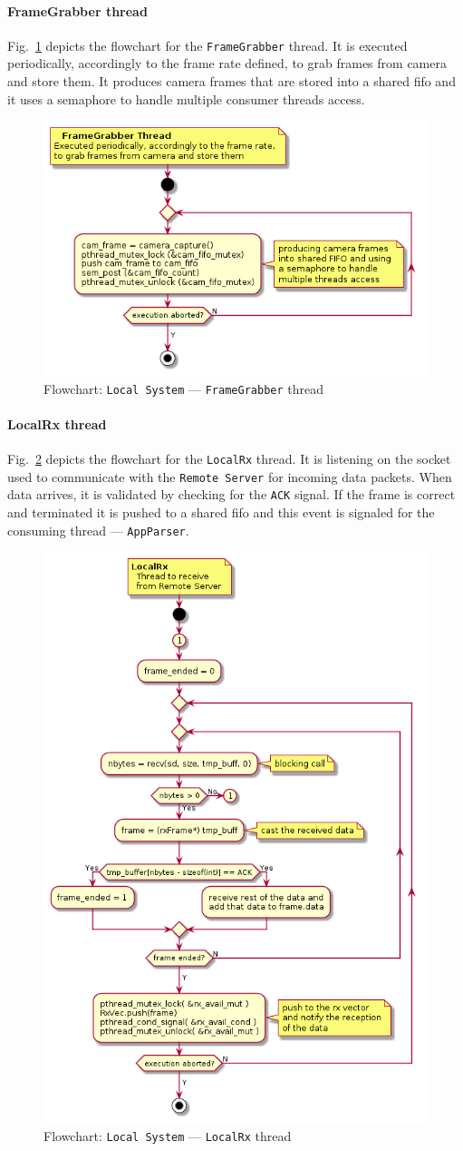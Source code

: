 \paragraph{FrameGrabber thread}
Fig.~\ref{fig:flow-local-frame-grabber} depicts the flowchart for the
\texttt{FrameGrabber} thread. It is executed periodically, accordingly to the
frame rate defined, to grab frames from camera and store them. It produces
camera frames that are stored into a shared \gls{fifo} and it uses a semaphore
to handle multiple consumer threads access.
%
\begin{figure}[htb!]
\centering
    \includegraphics[width=0.6\columnwidth]{./img/flow-local-frame-grabber.png}
  \caption{Flowchart: \texttt{Local System} --- \texttt{FrameGrabber} thread}%
\label{fig:flow-local-frame-grabber}
\end{figure}
%
\paragraph{LocalRx thread}
Fig.~\ref{fig:flow-local-rx} depicts the flowchart for the \texttt{LocalRx}
thread. It is listening on the socket used to communicate with the
\texttt{Remote Server} for incoming data packets. When data arrives, it is
validated by checking for the \texttt{ACK} signal. If the frame is correct and
terminated it is pushed to a shared \gls{fifo} and this event is signaled for
the consuming thread --- \texttt{AppParser}.
%
\begin{figure}[htb!]
\centering
    \includegraphics[width=0.6\columnwidth]{./img/flow-local-rx.png}
  \caption{Flowchart: \texttt{Local System} --- \texttt{LocalRx} thread}%
\label{fig:flow-local-rx}
\end{figure}
